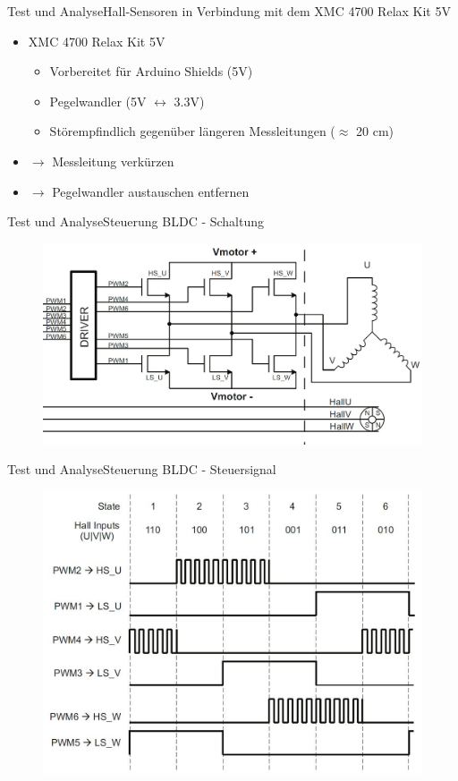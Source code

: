 \begin{frame}{Test und Analyse}{Hall-Sensoren in Verbindung mit dem XMC 4700 Relax Kit 5V}
	\begin{itemize}
		\item XMC 4700 Relax Kit 5V
		\begin{itemize}
			\item Vorbereitet für Arduino Shields (5V)
			\item Pegelwandler (5V $\leftrightarrow$ 3.3V)
			\item Störempfindlich gegenüber längeren Messleitungen ($\approx$ 20 cm)
		\end{itemize}
		\item $\rightarrow$ Messleitung verkürzen
		\item $\rightarrow$ Pegelwandler austauschen entfernen
	\end{itemize}
\end{frame}

\begin{frame}{Test und Analyse}{Steuerung BLDC - Schaltung}
	\begin{figure}
		\includegraphics[width=\textwidth]{Test/Aufbau_Ansteuerung_Motor}
	\end{figure}
\end{frame}

\begin{frame}{Test und Analyse}{Steuerung BLDC - Steuersignal}
	\begin{figure}
		\includegraphics[height=0.8\textheight]{Test/Ansteuerung_H-Bruecke}
	\end{figure}
\end{frame}

